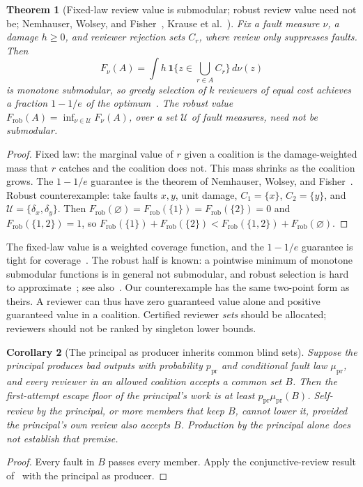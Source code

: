 \documentclass[11pt]{article}
\newtheorem{theorem}{Theorem}
\newtheorem{corollary}[theorem]{Corollary}
\theoremstyle{definition}
\theoremstyle{remark}
\newcommand{\ind}{\mathbf 1}
\newcommand{\pr}{\mathrm{pr}}
\begin{document}
\begin{theorem}[Fixed-law review value is submodular; robust review value need not
be; Nemhauser, Wolsey, and Fisher~\cite{nemhauser}, Krause et al.~\cite{krause08}]\label{thm:submodular}
Fix a fault measure $\nu$, a damage $h\ge0$, and reviewer rejection sets $C_r$, where review only
suppresses faults. Then
\[
F_\nu(A)=\int h\,\ind\Big\{z\in\bigcup_{r\in A}C_r\Big\}\,d\nu(z)
\]
is monotone submodular, so greedy selection of $k$ reviewers of equal cost achieves a fraction $1-1/e$
of the optimum~\cite{nemhauser}. The robust value $F_{\mathrm{rob}}(A)=\inf_{\nu\in\mathcal U}F_\nu(A)$,
over a set $\mathcal U$ of fault measures, need not be submodular.
\end{theorem}
\begin{proof}
Fixed law: the marginal value of $r$ given a coalition is the damage-weighted mass that $r$ catches and
the coalition does not. This mass shrinks as the coalition grows. The $1-1/e$ guarantee is the theorem
of Nemhauser, Wolsey, and Fisher~\cite{nemhauser}. Robust counterexample: take faults $x,y$, unit
damage, $C_1=\{x\}$, $C_2=\{y\}$, and $\mathcal U=\{\delta_x,\delta_y\}$. Then
$F_{\mathrm{rob}}(\varnothing)=F_{\mathrm{rob}}(\{1\})=F_{\mathrm{rob}}(\{2\})=0$ and
$F_{\mathrm{rob}}(\{1,2\})=1$, so
$F_{\mathrm{rob}}(\{1\})+F_{\mathrm{rob}}(\{2\})<F_{\mathrm{rob}}(\{1,2\})+F_{\mathrm{rob}}(\varnothing)$.
\end{proof}
The fixed-law value is a weighted coverage function, and the $1-1/e$ guarantee is tight for
coverage~\cite{feige98}. The robust half is known: a pointwise minimum of monotone submodular
functions is in general not submodular, and robust selection is hard to approximate~\cite{krause08};
see also~\cite{orlin18}. Our counterexample has the same two-point form as theirs.
A reviewer can thus have zero guaranteed value alone and positive guaranteed value in a coalition.
Certified reviewer \emph{sets} should be allocated; reviewers should not be ranked by singleton lower
bounds.

\begin{corollary}[The principal as producer inherits common blind sets]\label{cor:blind}
Suppose the principal produces bad outputs with probability $p_{\pr}$ and conditional fault law
$\mu_{\pr}$, and every reviewer in an allowed coalition accepts a common set $B$. Then the
first-attempt escape floor of the principal's work is at least $p_{\pr}\mu_{\pr}(B)$. Self-review by
the principal, or more members that keep $B$, cannot lower it, provided the principal's own review
also accepts $B$. Production by the principal alone does not establish that premise.
\end{corollary}
\begin{proof}
Every fault in $B$ passes every member. Apply the conjunctive-review result of~\cite{p6} with the
principal as producer.
\end{proof}
\end{document}
